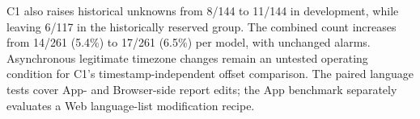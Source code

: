 

C1 also raises historical unknowns from 8/144 to 11/144 in development, while leaving 6/117 in the historically reserved group. The combined count increases from 14/261 (5.4\%) to 17/261 (6.5\%) per model, with unchanged alarms. Asynchronous legitimate timezone changes remain an untested operating condition for C1's timestamp-independent offset comparison. The paired language tests cover App- and Browser-side report edits; the App benchmark separately evaluates a Web language-list modification recipe.
